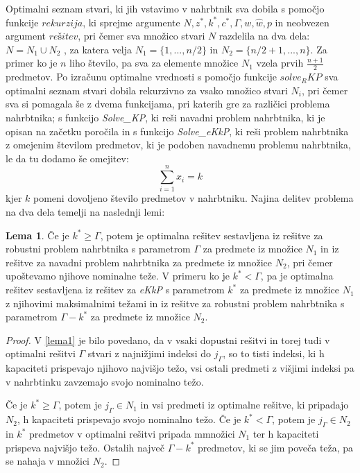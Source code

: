\documentclass[a4paper,12pt]{article}
\theoremstyle{definition}
\newtheorem{definition}{Lema}
\begin{document}
Optimalni seznam stvari, ki jih vstavimo v nahrbtnik sva dobila s pomočjo funkcije $rekurzija$,
ki sprejme argumente $N, z^*, k^*, c^*,  \Gamma, w, \hat{w}, p$ in neobvezen argument 
$rešitev$,  pri čemer sva množico stvari $N$ razdelila na dva dela: $N = N_1 \cup N_2$ , za 
katera velja $N_1 = \{1, ..., n / 2\} $ in $N_2 = \{n / 2 + 1, ..., n\}$. Za primer ko je $n$ 
liho število, pa sva za elemente množice $N_1$ vzela prvih $\frac{n +1}{2} $ predmetov. Po izračunu
optimalne vrednosti s pomočjo funkcije $solve_RKP$ sva optimalni seznam stvari dobila rekurzivno za 
vsako množico stvari $N_i$, pri čemer sva si pomagala še z dvema funkcijama, pri katerih gre 
za različici problema nahrbtnika; s funkcijo \textit{Solve\_KP}, ki reši navadni problem
nahrbtnika, ki je opisan na začetku poročila in s funkcijo \textit{Solve\_eKkP}, ki reši 
problem nahrbtnika z omejenim številom predmetov, ki je podoben navadnemu problemu nahrbtnika, 
le da tu dodamo še omejitev:
\begin{equation}
\tag*{}   
\sum_{i=1}^{n}x_i = k
\end{equation} kjer $k$ pomeni dovoljeno število predmetov v nahrbtniku.
Najina delitev problema na dva dela temelji na naslednji lemi:
\begin{definition}
Če je $k^* \geq \Gamma$, potem je optimalna rešitev sestavljena iz rešitve za robustni problem 
nahrbtnika s parametrom $\Gamma$ za predmete iz množice $N_1$ in iz rešitve za navadni problem 
nahrbtnika za predmete iz množice $N_2$, pri čemer upoštevamo njihove nominalne teže. 
V primeru ko  je $k^* < \Gamma$, pa je optimalna rešitev sestavljena iz rešitev za
\textit{eKkP} s parametrom $k^*$ za predmete iz množice $N_1$ z njihovimi maksimalnimi 
težami in iz rešitve za robustni problem nahrbtnika s parametrom   $\Gamma - k^*$ za predmete 
iz množice $N_2$.
\end{definition}
\begin{proof}
    V \ref{lema1} je bilo povedano, da v vsaki dopustni rešitvi
    in torej tudi v optimalni rešitvi $\Gamma$ stvari z najnižjimi
    indeksi do $j_\Gamma$, so to tisti indeksi, ki h kapaciteti prispevajo
    njihovo najvišjo težo, vsi ostali predmeti z višjimi indeksi
    pa v nahrbtinku zavzemajo svojo nominalno težo. 
    \par
    Če je $k^* \geq \Gamma$, potem je $j_\Gamma \in N_1$ in vsi predmeti
    iz optimalne rešitve, ki pripadajo $N_2$, h kapaciteti prispevajo
    svojo nominalno težo.
    Če je $k^* < \Gamma$, potem je $j_\Gamma \in N_2$ in $k^*$
    predmetov v optimalni rešitvi pripada mmnožici $N_1$ 
    ter h kapaciteti prispeva najvišjo težo. Ostalih največ
    $\Gamma - k^*$ predmetov, ki se jim poveča teža, pa se nahaja
    v množici $N_2$.
\end{proof}
\end{document}
